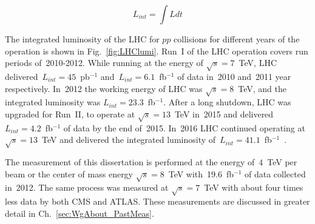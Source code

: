
\begin{equation}\label{eq:integratedL}
  L_{int}=\int L dt
\end{equation}


The integrated luminosity of the LHC for $pp$ collisions for different years of the operation is shown in Fig.~\ref{fig:LHClumi}. Run~I of the LHC operation covers run periods of~2010-2012. While running at the energy of $\sqrt{s}=7$~TeV, LHC delivered~$L_{int}=45$~pb$^{-1}$ and~$L_{int}=6.1$~fb$^{-1}$ of data in~2010 and~2011 year respectively. In~2012 the working energy of LHC was $\sqrt{s}=8$~TeV, and the integrated luminosity was $L_{int}=23.3$~fb$^{-1}$.  After a long shutdown, LHC was upgraded for Run~II, to operate at $\sqrt{s}=13$~TeV in~2015 and delivered~$L_{int}=4.2$~fb$^{-1}$ of data by the end of~2015. In~2016 LHC continued operating at $\sqrt{s}=13$~TeV and delivered the integrated luminosity of~$L_{int}=41.1$~fb$^{-1}$~\cite{ref_LHClumi_twiki}.

The measurement of this dissertation is performed at the energy of~$4$~TeV per beam or the center of mass energy $\sqrt{s}=8$~TeV with~19.6~fb$^{-1}$ of data collected in~2012. The same process was measured at $\sqrt{s}=7$~TeV with about four times less data by both CMS and ATLAS. These measurements are discussed in greater detail in Ch.~\ref{sec:WgAbout_PastMeas}.

